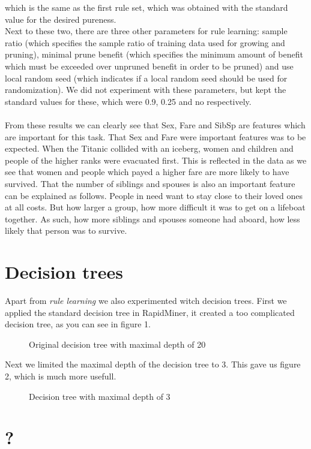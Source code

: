 \documentclass[12pt,a4paper]{article}
\begin{document}
which is the same as the first rule set, which was obtained with the standard value for the desired pureness.\\
Next to these two, there are three other parameters for rule learning: sample ratio (which specifies the sample ratio of training data used for growing and pruning), minimal prune benefit (which specifies the minimum amount of benefit which must be exceeded over unpruned benefit in order to be pruned) and use local random seed (which indicates if a local random seed should be used for randomization). We did not experiment with these parameters, but kept the standard values for these, which were 0.9, 0.25 and no respectively.\\
\\
From these results we can clearly see that Sex, Fare and SibSp are features which are important for this task. That Sex and Fare were important features was to be expected. When the Titanic collided with an iceberg, women and children and people of the higher ranks were evacuated first. This is reflected in the data as we see that women and people which payed a higher fare are more likely to have survived. That the number of siblings and spouses is also an important feature can be explained as follows. People in need want to stay close to their loved ones at all costs. But how larger a group, how more difficult it was to get on a lifeboat together. As such, how more siblings and spouses someone had aboard, how less likely that person was to survive.

\section{Decision trees}

Apart from \emph{rule learning} we also experimented witch decision trees. First we applied the standard decision tree in RapidMiner, it created a too complicated decision tree, as you can see in figure 1.
\begin{figure}[H]
  \centering
  
  \caption{Original decision tree with maximal depth of 20}
\end{figure}
Next we limited the maximal depth of the decision tree to 3. This gave us figure 2, which is much more usefull.
\begin{figure}[H]
  \centering
  
  \caption{Decision tree with maximal depth of 3}
\end{figure}


\section{?}
\end{document}
